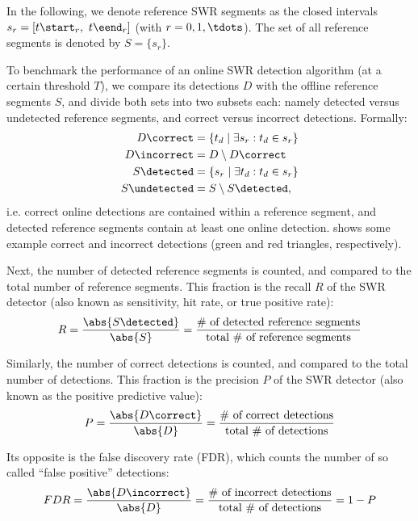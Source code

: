 In the following, we denote reference SWR segments as the closed intervals $s_r = [ t\start_r,\ t\eend_r ]$ (with $r = 0, 1, \tdots$). The set of all reference segments is denoted by $S = \{ s_r \}$.

To benchmark the performance of an online SWR detection algorithm (at a certain threshold $T$), we compare its detections $D$ with the offline reference segments $S$, and divide both sets into two subsets each: namely detected versus undetected reference segments, and correct versus incorrect detections. Formally:
%
\begin{align}
D\correct    &= \{ t_d \mid \exists s_r : t_d \in s_r \}   \\
D\incorrect  &= D \setminus D\correct                      \\
S\detected   &= \{ s_r \mid \exists t_d : t_d \in s_r \}   \\
S\undetected &= S \setminus S\detected,
\end{align}
%
i.e. correct online detections are contained within a reference segment, and detected reference segments contain at least one online detection.  shows some example correct and incorrect detections (green and red triangles, respectively).

Next, the number of detected reference segments is counted, and compared to the total number of reference segments. This fraction is the recall $R$ of the SWR detector (also known as sensitivity, hit rate, or true positive rate):
\begin{equation}
R = \frac{\abs{S\detected}}{\abs{S}}
  = \frac{\text{\# of detected reference segments}}
         {\text{total \# of reference segments}}
\end{equation}

Similarly, the number of correct detections is counted, and compared to the total number of detections. This fraction is the precision $P$ of the SWR detector (also known as the positive predictive value):
\begin{equation}
P = \frac{\abs{D\correct}}{\abs{D}}
  = \frac{\text{\# of correct detections}}
         {\text{total \# of detections}}
\end{equation}

Its opposite is the false discovery rate (FDR), which counts the number of so called ``false positive'' detections:
\begin{align}
FDR = \frac{\abs{D\incorrect}}{\abs{D}} 
    = \frac{\text{\# of incorrect detections}}
           {\text{total \# of detections}}
   = 1 - P
\end{align}

